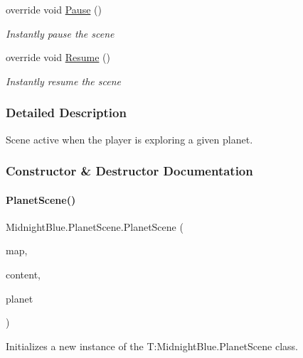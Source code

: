 \begin{DoxyCompactItemize}
override void \hyperlink{class_midnight_blue_1_1_planet_scene_abc077e1cd5f40879ca3af4224f0ff455}{Pause} ()
\begin{DoxyCompactList}\small\item\em Instantly pause the scene \end{DoxyCompactList}\item 
override void \hyperlink{class_midnight_blue_1_1_planet_scene_aa14750d3675b59462796e821b3921397}{Resume} ()
\begin{DoxyCompactList}\small\item\em Instantly resume the scene \end{DoxyCompactList}\end{DoxyCompactItemize}


\subsubsection{Detailed Description}
Scene active when the player is exploring a given planet. 



\subsubsection{Constructor \& Destructor Documentation}
\hypertarget{class_midnight_blue_1_1_planet_scene_a50ee691836116a89ff549e519f895ba3}{}\label{class_midnight_blue_1_1_planet_scene_a50ee691836116a89ff549e519f895ba3} 
\paragraph{\texorpdfstring{Planet\+Scene()}{PlanetScene()}}
{\footnotesize\ttfamily Midnight\+Blue.\+Planet\+Scene.\+Planet\+Scene (\begin{DoxyParamCaption}\item[{Entity\+Map}]{map,  }\item[{Content\+Manager}]{content,  }\item[{\hyperlink{class_midnight_blue_1_1_planet}{Planet}}]{planet }\end{DoxyParamCaption})\hspace{0.3cm}{\ttfamily [inline]}}



Initializes a new instance of the T\+:\+Midnight\+Blue.\+Planet\+Scene class. 


